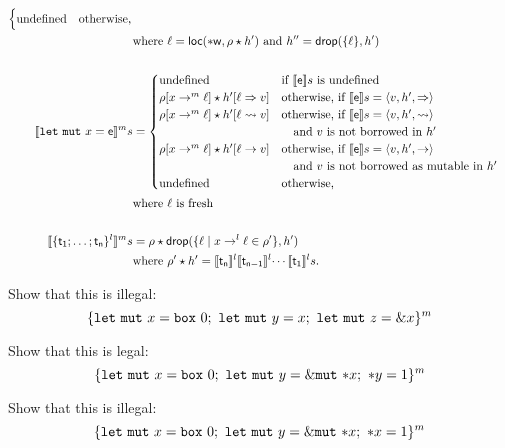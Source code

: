 \begin{definition}
\begin{align*}
\begin{cases}
      \text{undefined} & \text{otherwise,}
    \end{cases}\\
    &\text{where $\ell=\loc(*\mathsf{w},\rho\star h')$ and $h''=\drop(\{\ell\},h')$}\\
    \mbox{}\\
    \denl[\mathtt{let\ mut}\ x=\mathsf{e}]{m}{s}&=
    \begin{cases}
      \text{undefined} & \text{if $\den[\mathsf{e}]{s}$ is undefined}\\
      \rho[x\to^m\ell]\star h'[\ell\Rightarrow v] & \text{otherwise, if $\den[\mathsf{e}]{s}=\langle v,h',\Rightarrow\rangle$}\\
      \rho[x\to^m\ell]\star h'[\ell\leadsto v] & \text{otherwise, if $\den[\mathsf{e}]{s}=\langle v,h',\leadsto\rangle$}\\
      & \quad\text{and $v$ is not borrowed in $h'$}\\
      \rho[x\to^m\ell]\star h'[\ell\to v] & \text{otherwise, if $\den[\mathsf{e}]{s}=\langle v,h',\to\rangle$}\\
      &\quad\text{and $v$ is not borrowed as mutable in $h'$}\\
      \text{undefined} & \text{otherwise,}
    \end{cases}\\
    &\text{where $\ell$ is fresh}\\
    \mbox{}\\
    \denl[\{\mathsf{t_1};\ldots;\mathsf{t_n}\}^l]{m}{s}&=\rho\star\drop(\{\ell\mid x\to^l\ell\in\rho'\},h')\\
    &\text{where $\rho'\star h'=\denl[\mathsf{t_n}]{l}{\denl[\mathsf{t_{n-1}}]{l}{\cdots\denl[\mathsf{t_1}]{l}{s}}}$.}
  \end{align*}
\end{definition}

\begin{example}
  Show that this is illegal:
  \[
    \{
      \mathtt{let\ mut}\ x = \mathtt{box}\ 0;\
      \mathtt{let\ mut}\ y = x;\
      \mathtt{let\ mut}\ z = \borrow x
    \}^m
  \]
\end{example}

\begin{example}
  Show that this is legal:
  \[
    \{
      \mathtt{let\ mut}\ x = \mathtt{box}\ 0;\
      \mathtt{let\ mut}\ y = \mutborrow \mathtt{*}x;\
      \mathtt{*}y = 1
    \}^m
  \]
\end{example}

\begin{example}
  Show that this is illegal:
  \[
    \{
      \mathtt{let\ mut}\ x = \mathtt{box}\ 0;\
      \mathtt{let\ mut}\ y = \mutborrow \mathtt{*}x;\
      \mathtt{*}x = 1
    \}^m
  \]
\end{example}

